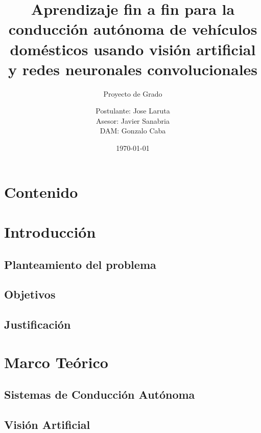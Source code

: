 \documentclass[]{beamer}
\title{Aprendizaje fin a fin para la conducción autónoma de vehículos domésticos usando visión artificial y redes neuronales convolucionales}
\subtitle{Proyecto de Grado}
\author[Jose Laruta]{Postulante: Jose Laruta \\
Asesor: Javier Sanabria \\ 
DAM: Gonzalo Caba}
\institute[UMSA]{Universidad Mayor de San Andres}
\date{\today}
\begin{document}
    \begin{frame}
        \titlepage
    \end{frame}
     
    \section*{Contenido}
    \begin{frame}[allowframebreaks]
        \tableofcontents
    \end{frame}
    
    \section{Introducción}

        \subsection{Planteamiento del problema}
        \begin{frame}
        \end{frame}

        \subsection{Objetivos}
        \begin{frame}
        \end{frame}

        \subsection{Justificación}
        \begin{frame}
        \end{frame}

    \section{Marco Teórico}
        \subsection{Sistemas de Conducción Autónoma}
        \begin{frame}
        \end{frame}

        \subsection{Visión Artificial}
        \begin{frame}
        \end{frame}
\end{document}
